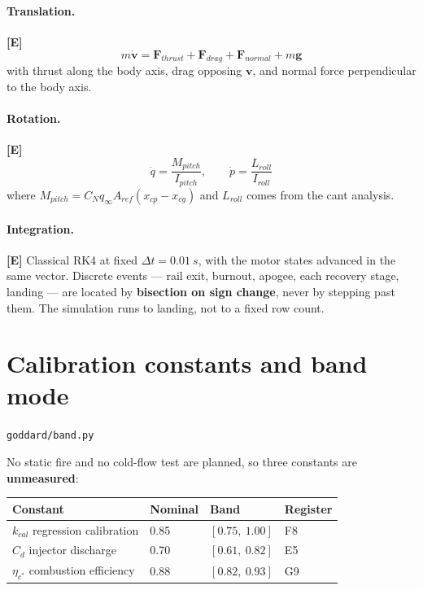 \documentclass[11pt,a4paper]{article}
\newcommand{\established}{\textcolor{okgreen}{\textbf{[E]}}\xspace}
\newcommand{\src}[1]{\hfill{\footnotesize\texttt{#1}}}
\begin{document}
\paragraph{Translation.} \established
\begin{equation}
m\dot{\mathbf v} = \mathbf F_{thrust} + \mathbf F_{drag}
                 + \mathbf F_{normal} + m\mathbf g
\end{equation}
with thrust along the body axis, drag opposing $\mathbf v$, and normal force
perpendicular to the body axis.

\paragraph{Rotation.} \established
\begin{equation}
\dot q = \frac{M_{pitch}}{I_{pitch}}, \qquad
\dot p = \frac{L_{roll}}{I_{roll}}
\end{equation}
where $M_{pitch} = C_N q_\infty A_{ref} (x_{cp} - x_{cg})$ and $L_{roll}$ comes
from the cant analysis.

\paragraph{Integration.} \established
Classical RK4 at fixed $\Delta t = \SI{0.01}{s}$, with the motor states advanced
in the same vector. Discrete events --- rail exit, burnout, apogee, each
recovery stage, landing --- are located by \textbf{bisection on sign change},
never by stepping past them. The simulation runs to landing, not to a fixed row
count.

\section{Calibration constants and band mode}
\label{sec:band}
\src{goddard/band.py}

No static fire and no cold-flow test are planned, so three constants are
\textbf{unmeasured}:

\begin{center}
\begin{tabular}{@{}llll@{}}
\toprule
Constant & Nominal & Band & Register \\
\midrule
$k_{cal}$ regression calibration & 0.85 & $[0.75,\ 1.00]$ & F8 \\
$C_d$ injector discharge         & 0.70 & $[0.61,\ 0.82]$ & E5 \\
$\eta_{c^*}$ combustion efficiency & 0.88 & $[0.82,\ 0.93]$ & G9 \\
\bottomrule
\end{tabular}
\end{center}
\end{document}
